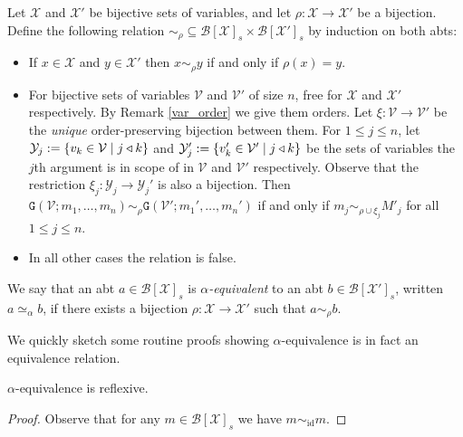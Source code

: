 \begin{defin}\label{alpha}
    Let $\mathcal{X}$ and $\mathcal{X}'$ be bijective sets of variables, and let $\rho : \mathcal{X} \to \mathcal{X'}$ be a bijection. Define the following relation $\sim_\rho \subseteq \mathcal{B}[\mathcal{X}]_s \times \mathcal{B}[\mathcal{X}']_s$ by induction on both abts:
    \begin{itemize}
        \item If $x \in \mathcal{X}$ and $y \in \mathcal{X}'$ then $x \sim_\rho y $ if and only if $\rho(x) = y$.
        \item For bijective sets of variables $\mathcal{V}$ and $\mathcal{V}'$ of size $n$, free for $\mathcal{X}$ and $\mathcal{X}'$ respectively. By Remark \ref{var_order} we give them orders. Let $\xi : \mathcal{V} \to \mathcal{V}'$ be the \emph{unique} order-preserving bijection between them. For $1 \le j \le n$, let $\mathcal{Y}_j := \{ v_k \in \mathcal{V} \mid j \triangleleft k\}$ and $\mathcal{Y}_j' := \{ v_k' \in \mathcal{V}' \mid j \triangleleft k \}$ be the sets of variables the $j$th argument is in scope of in $\mathcal{V}$ and $\mathcal{V}'$ respectively. Observe that the restriction $\xi_j : \mathcal{Y}_j \to \mathcal{Y}_j'$ is also a bijection. Then $\mathtt{G}(\mathcal{V}; m_1, \dots, m_n) \sim_\rho \mathtt{G}(\mathcal{V}'; m_1', \dots, m_n')$ if and only if $m_j \sim_{\rho \cup \xi_j} M'_j$ for all $1 \le j \le n$.
        \item In all other cases the relation is false.
    \end{itemize}

    We say that an abt $a \in \mathcal{B}[\mathcal{X}]_s$ is \emph{$\alpha$-equivalent} to an abt $b \in \mathcal{B}[\mathcal{X}']_s$, written $a \simeq_{\alpha} b$, if there exists a bijection $\rho : \mathcal{X} \to \mathcal{X'}$ such that $a \sim_\rho b$.
\end{defin}

We quickly sketch some routine proofs showing $\alpha$-equivalence is in fact an equivalence relation.

\begin{lemma}[Reflexivity]
    $\alpha$-equivalence is reflexive.
\end{lemma}
    
\begin{proof}    
     Observe that for any $m \in \mathcal{B}[\mathcal{X}]_s$ we have $m \sim_{\mathrm{id}} m$. 
\end{proof}

